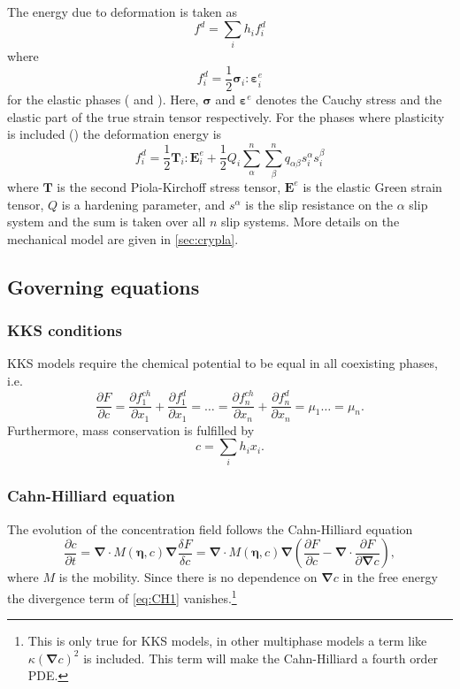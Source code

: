 \documentclass[12pt,a4paper]{article}
\newcommand{\vardiff}[2]{\frac{\delta#1}{\delta#2}}
\newcommand{\partdiff}[2]{\frac{\partial#1}{\partial#2}}
\providecommand{\vbf}[1]{\boldsymbol{#1}}
\providecommand{\gradient}[0]{\vbf{\nabla}}
\begin{document}
The energy due to deformation is taken as 
\begin{equation}
  f^d=\sum_i h_if^d_i
\end{equation}
where
\begin{equation}
  f^d_i = \frac{1}{2}\vbf{\sigma}_i:\vbf{\varepsilon}^e_i
\end{equation}
for the elastic phases ( and ).
Here, $\vbf{\sigma}$ and $\vbf{\varepsilon}^e$ denotes the Cauchy stress and the elastic part of the true strain tensor respectively.
For the phases where plasticity is included () the deformation energy is
\begin{equation}
  f^d_i = \frac{1}{2}\vbf{T}_i:\vbf{E}^e_i+\frac{1}{2}Q_i\sum_\alpha^n\sum_\beta^n q_{\alpha\beta}s^\alpha_i s^\beta_i
\end{equation}
where $\vbf{T}$ is the second Piola-Kirchoff stress tensor, $\vbf{E}^e$ is the elastic Green strain tensor, $Q$ is a hardening parameter, and $s^\alpha$ is the slip resistance on the $\alpha$ slip system and the sum is taken over all $n$ slip systems.  
More details on the mechanical model are given in \cref{sec:crypla}.

\subsection{Governing equations}
\subsubsection{KKS conditions}
KKS models require the chemical potential to be equal in all coexisting phases, i.e.
\begin{equation}
  \partdiff{F}{c}=\partdiff{f_1^{ch}}{x_1}+\partdiff{f^d_1}{x_1}=\dots=\partdiff{f_n^{ch}}{x_n}+\partdiff{f^d_n}{x_n}=\mu_1\dots=\mu_n.
  \label{eq:KKS}
\end{equation}
Furthermore, mass conservation is fulfilled by
\begin{equation}
  c=\sum_ih_ix_i.
  \label{eq:mass}
\end{equation}
\subsubsection{Cahn-Hilliard equation}
The evolution of the concentration field follows the Cahn-Hilliard equation
\begin{equation}
  \partdiff{c}{t}=\gradient\cdot M(\vbf{\eta},c)\gradient \vardiff{F}{c}=\gradient\cdot M(\vbf{\eta},c)\gradient\left(\partdiff{F}{c}-\gradient\cdot\partdiff{F}{\gradient c}\right),
  \label{eq:CH1}
\end{equation}
where $M$ is the mobility.
Since there is no dependence on $\gradient c$ in the free energy the divergence term of \cref{eq:CH1} vanishes.\footnote{This is only true for KKS models, in other multiphase models a term like $\kappa\left(\gradient c\right)^2$ is included.
This term will make the Cahn-Hilliard a fourth order PDE.}
\end{document}
